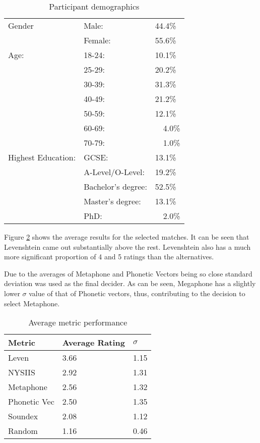 \begin{table}[h!]
    \centering
    \begin{tabular}{|l|ll|}
        \hline
        Gender & Male: & 44.4\% \\
               & Female: & 55.6\% \\
        \hline
        Age:   & 18-24: & 10.1\% \\
               & 25-29: & 20.2\% \\
               & 30-39: & 31.3\% \\
               & 40-49: & 21.2\% \\
               & 50-59: & 12.1\% \\
               & 60-69: & ~~4.0\% \\ 
               & 70-79: & ~~1.0\% \\ 
               
        \hline
        Highest Education:  
        & GCSE:                 & 13.1\% \\
        & A-Level/O-Level:      & 19.2\% \\
        & Bachelor's degree:    & 52.5\% \\
        & Master's degree:      & 13.1\% \\ 
        & PhD:                  & ~~2.0\%  \\
        \hline

    \end{tabular}
    \caption{Participant demographics}
    \label{tab:exp1_demo}
\end{table}

Figure \ref{tab:exp1_results} shows the average results for the selected matches. It can be seen that Levenshtein came out substantially above the rest. Levenshtein also has a much more significant proportion of 4 and 5 ratings than the alternatives.

Due to the averages of Metaphone and Phonetic Vectors being so close standard deviation was used as the final decider. As can be seen, Megaphone has a slightly lower $\sigma$ value of that of Phonetic vectors, thus, contributing to the decision to select Metaphone.

\begin{table}[h!]
    \centering
    \begin{tabular}{|l|l|l|}
        \hline
        \textbf{Metric} & \textbf{Average Rating}  & \textbf{$\sigma$}\\
        \hline
        Leven     & 3.66  & 1.15\\
        NYSIIS    & 2.92 & 1.31\\
        Metaphone & 2.56 & 1.32\\
        Phonetic Vec & 2.50 & 1.35\\
        Soundex & 2.08 & 1.12 \\
        \hline
        Random  & 1.16 & 0.46\\
        \hline
    \end{tabular}
    \caption{Average metric performance}
    \label{tab:exp1_results}
\end{table}


